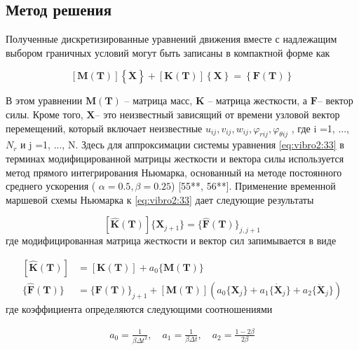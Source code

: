  
\subsection{Метод решения}\label{ch:ch3/sec3/sub5}

Полученные дискретизированные уравнений движения  вместе с надлежащим выбором граничных условий могут быть записаны в компактной форме как

\begin{equation}
	\label{eq:vibro2:33}
	\left [ \boldsymbol{M(T)}\right ]  \left \{ \boldsymbol{\ddot{X}} \right \} + \left [ \boldsymbol{K(T)}\right ]  \left \{ \boldsymbol{X} \right \} = \left \{ \boldsymbol{F(T)} \right \}
\end{equation}

В этом уравнении \( \boldsymbol{M(T)}\) -- матрица масс, \(  \boldsymbol{K} \) -- матрица жесткости, а \(  \boldsymbol{F}\)-- вектор силы. Кроме того, \( \boldsymbol{X} \)-- это неизвестный зависящий от времени узловой вектор перемещений, который включает неизвестные \(u_{ij} , v_{ij} , w_{ij} , \varphi_{rij} , \varphi_{\theta ij}\) , где i =1, ..., \(N_r\) и j =1, ..., N. Здесь для аппроксимации системы уравнения \cref{eq:vibro2:33} в терминах модифицированной матрицы жесткости и вектора силы используется метод прямого интегрирования Ньюмарка, основанный на методе постоянного среднего ускорения ( \(\alpha = 0.5, \beta= 0.25\)) [55**, 56**]. Применение временной маршевой схемы Ньюмарка к \cref{eq:vibro2:33} дает следующие результаты


\begin{equation}
	\label{eq:vibro2:34}
	[\boldsymbol{\hat{K}(T)}] \{\boldsymbol{X}_{j+1} \} = \{ \boldsymbol{\hat{F}(T)} \}_{j, j+1}
\end{equation}
где модифицированная матрица жесткости и вектор сил запимывается в виде

\begin{equation}
	\label{eq:vibro2:35}
	\begin{split}
	[\boldsymbol{\hat{K}(T)}] &= [\boldsymbol{K(T)} ] + a_0 \{ \boldsymbol{M(T)} \}
	\\
	\{ \boldsymbol{\hat{F}(T)} \} &= \{ \boldsymbol{F(T)} \}_{j+1} + [\boldsymbol{M(T)}] (a_0 \{\boldsymbol{X}_{j} \} + a_1\{\boldsymbol{\dot{X}}_{j} \} +a_2 \{\boldsymbol{\ddot{X}}_{j} \} )
	\end{split}
\end{equation}
где коэффициента определяются следующими соотношениями

\begin{equation}
	\label{eq:vibro2:36}
	\begin{split}
	a_0 = \frac{1}{\beta \Delta t^2}, \quad a_1 =\frac{1}{\beta \Delta t}, \quad a_2 = \frac{1-2\beta}{2\beta}
	\end{split}
\end{equation}

